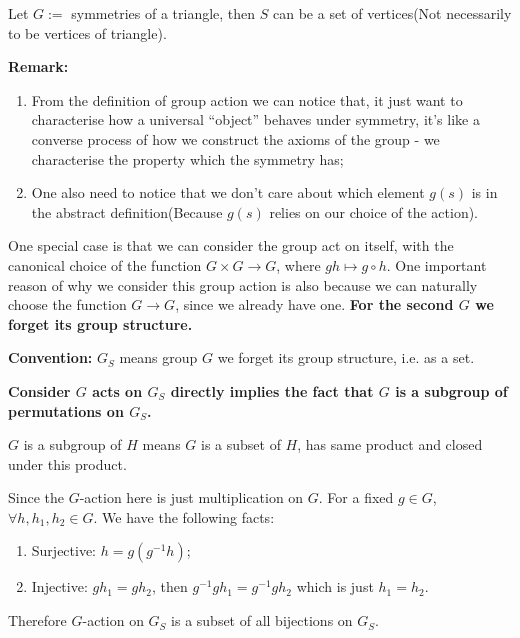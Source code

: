 \documentclass[11pt]{article}
\begin{document}
\begin{examplle}[ ]
Let \(G :=\) symmetries of a triangle, then \(S\) can be a set of vertices(Not necessarily to be vertices of triangle).
\end{examplle}

\textbf{Remark:}
\begin{enumerate}
\item From the definition of group action we can notice that, it just want to characterise how a universal ``object'' behaves under symmetry, it's like a converse process of how we construct the axioms of the group - we characterise the property which the symmetry has;
\item One also need to notice that we don't care about which element \(g(s)\) is in the abstract definition(Because \(g(s)\) relies on our choice of the action).
\end{enumerate}

One special case is that we can consider the group act on itself, with the canonical choice of the function \(G \times G \to G\), where \(gh \mapsto g\circ h\). One important reason of why we consider this group action is also because we can naturally choose the function \(G \to G\), since we already have one. \textbf{For the second \(G\) we forget its group structure.}

\textbf{Convention:} \(G_S\) means group \(G\) we forget its group structure, i.e. as a set.

\textbf{Consider \(G\) acts on \(G_S\) directly implies the fact that \(G\) is a subgroup of permutations on \(G_S\).}

\begin{definition}[Subgroup]
\(G\) is a subgroup of \(H\) means \(G\) is a subset of \(H\), has same product and closed under this product.
\end{definition}

\begin{lemma}
Since the \(G\)-action here is just multiplication on \(G\). For a fixed \(g \in G\), \(\forall h, h_1, h_2 \in G\). We have the following facts:
\begin{enumerate}
\item Surjective: \(h = g (g^{-1} h)\);
\item Injective: \(gh_1 = gh_2\), then \(g^{-1}gh_1 = g^{-1}gh_2\) which is just \(h_1 = h_2\).
\end{enumerate}
Therefore \(G\)-action on \(G_S\) is a subset of all bijections on \(G_S\).
\end{lemma}
\end{document}
